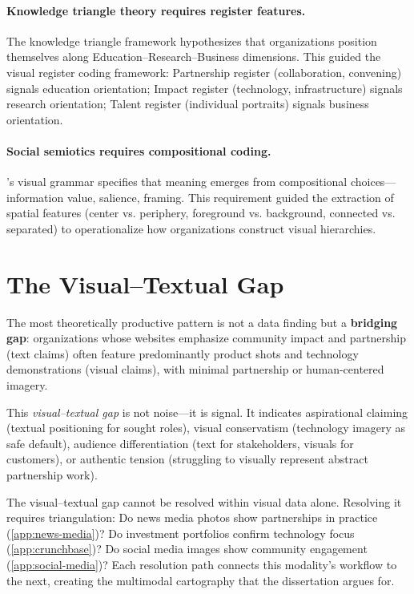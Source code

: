\documentclass[../main.tex]{subfiles}
\begin{document}
\paragraph{Knowledge triangle theory requires register features.}
The knowledge triangle framework hypothesizes that organizations position
themselves along Education--Research--Business dimensions.
This guided the visual register coding framework:
Partnership register (collaboration, convening) signals education orientation;
Impact register (technology, infrastructure) signals research orientation;
Talent register (individual portraits) signals business orientation.

\paragraph{Social semiotics requires compositional coding.}
\textcite{kress2006reading}'s visual grammar specifies that meaning emerges
from compositional choices---information value, salience, framing.
This requirement guided the extraction of spatial features
(center vs. periphery, foreground vs. background, connected vs. separated)
to operationalize how organizations construct visual hierarchies.


\section{The Visual--Textual Gap}
\label{sec:visual-gap}

The most theoretically productive pattern is not a data finding
but a \textbf{bridging gap}: organizations whose websites emphasize
community impact and partnership (text claims) often feature
predominantly product shots and technology demonstrations (visual claims),
with minimal partnership or human-centered imagery.

This \emph{visual--textual gap} is not noise---it is signal.
It indicates aspirational claiming (textual positioning for sought roles),
visual conservatism (technology imagery as safe default),
audience differentiation (text for stakeholders, visuals for customers),
or authentic tension (struggling to visually represent abstract partnership work).

\begin{criticalbox}
The visual--textual gap cannot be resolved within visual data alone.
Resolving it requires triangulation:
Do news media photos show partnerships in practice (\cref{app:news-media})?
Do investment portfolios confirm technology focus (\cref{app:crunchbase})?
Do social media images show community engagement (\cref{app:social-media})?
Each resolution path connects this modality's workflow to the next,
creating the multimodal cartography that the dissertation argues for.
\end{criticalbox}
\end{document}
